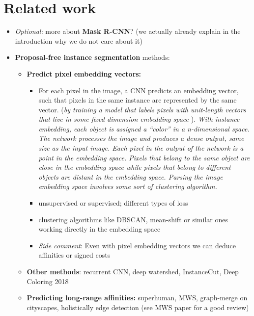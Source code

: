 \documentclass[10pt,twocolumn,letterpaper]{article}
\newcommand\TODO[1]{{\color{red}{TODO: #1}}}
\newcommand\SOURCE[1]{{\color{green}{(from: #1)}}}
\begin{document}
\section{Related work}
\begin{itemize}
\item \textit{Optional:} more about \textbf{Mask R-CNN}? (we actually already explain in the introduction why we do not care about it)
\item \textbf{Proposal-free instance segmentation} methods:
\begin{itemize}
\item \textbf{Predict pixel embedding vectors:} 
\begin{itemize}
\item For each pixel in the image, a CNN predicts an embedding vector, such that pixels in the same instance are represented by the same vector. (\textit{by training a model that labels pixels with unit-length vectors that live in some ﬁxed dimension embedding space} \SOURCE{Rec. embeddings} ). \textit{With instance embedding, each object is assigned a “color” in a n-dimensional space. The network processes the image and produces a dense output, same size as the input image. Each pixel in the output of the network is a point in the embedding space. Pixels that belong to the same object are close in the embedding space while pixels that belong to different objects are distant in the embedding space. Parsing the image embedding space involves some sort of clustering algorithm.} \SOURCE{online} 
\item unsupervised or supervised; different types of loss \TODO{Find good summary}
\item clustering algorithms like DBSCAN, mean-shift or similar ones working directly in the embedding space  \TODO{Add refs, discuss with Roman}
\item \textit{Side comment}: Even with pixel embedding vectors we can deduce affinities or signed costs
\end{itemize}
\item \textbf{Other methods}: recurrent CNN, deep watershed, InstanceCut, Deep Coloring 2018 \TODO{Add more, discuss with Roman}
\item \textbf{Predicting long-range affinities:} superhuman, MWS, graph-merge on cityscapes, holistically edge detection (see MWS paper for a good review) \TODO{Add more}
\end{itemize}


\end{itemize}
\end{document}
